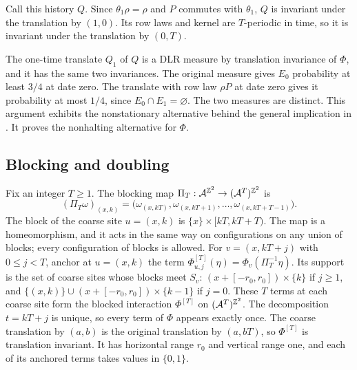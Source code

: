 Call this history \(Q\). Since \(\theta_1\rho=\rho\) and \(P\) commutes with \(\theta_1\), \(Q\) is invariant under the translation by \((1,0)\). Its row laws and kernel are \(T\)-periodic in time, so it is invariant under the translation by \((0,T)\).

The one-time translate \(Q_1\) of \(Q\) is a DLR measure by translation invariance of \(\Phi\), and it has the same two invariances. The original measure gives \(E_0\) probability at least \(3/4\) at date zero. The translate with row law \(\rho P\) at date zero gives it probability at most \(1/4\), since \(E_0\cap E_1=\varnothing\). The two measures are distinct. This argument exhibits the nonstationary alternative behind the general implication in \cite[Theorem~9.2 and Corollary~9.3]{dmSpaceTime}. It proves the nonhalting alternative for \(\Phi\).

\subsection{Blocking and doubling}\label{sec:blocking}

Fix an integer \(T\ge1\). The blocking map \(\Pi_T:\mathcal A^{\mathbb Z^2}\to(\mathcal A^T)^{\mathbb Z^2}\) is
\[
(\Pi_T\omega)_{(x,k)}=\bigl(\omega_{(x,kT)},\omega_{(x,kT+1)},\ldots,\omega_{(x,kT+T-1)}\bigr).
\]
The block of the coarse site \(u=(x,k)\) is \(\{x\}\times[kT,kT+T)\). The map is a homeomorphism, and it acts in the same way on configurations on any union of blocks; every configuration of blocks is allowed. For \(v=(x,kT+j)\) with \(0\le j<T\), anchor at \(u=(x,k)\) the term \(\Phi^{[T]}_{u,j}(\eta)=\Phi_v(\Pi_T^{-1}\eta)\). Its support is the set of coarse sites whose blocks meet \(S_v\): \((x+[-r_0,r_0])\times\{k\}\) if \(j\ge1\), and \(\{(x,k)\}\cup(x+[-r_0,r_0])\times\{k-1\}\) if \(j=0\). These \(T\) terms at each coarse site form the blocked interaction \(\Phi^{[T]}\) on \((\mathcal A^T)^{\mathbb Z^2}\). The decomposition \(t=kT+j\) is unique, so every term of \(\Phi\) appears exactly once. The coarse translation by \((a,b)\) is the original translation by \((a,bT)\), so \(\Phi^{[T]}\) is translation invariant. It has horizontal range \(r_0\) and vertical range one, and each of its anchored terms takes values in \(\{0,1\}\).

